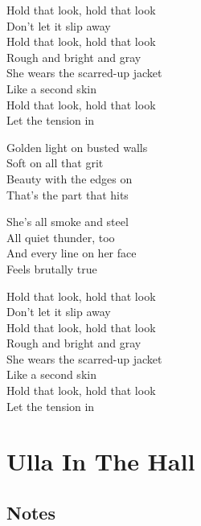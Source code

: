 \begin{lyrics}
Hold that look, hold that look\\
Don’t let it slip away\\
Hold that look, hold that look\\
Rough and bright and gray\\
She wears the scarred-up jacket\\
Like a second skin\\
Hold that look, hold that look\\
Let the tension in

Golden light on busted walls\\
Soft on all that grit\\
Beauty with the edges on\\
That’s the part that hits

She’s all smoke and steel\\
All quiet thunder, too\\
And every line on her face\\
Feels brutally true

Hold that look, hold that look\\
Don’t let it slip away\\
Hold that look, hold that look\\
Rough and bright and gray\\
She wears the scarred-up jacket\\
Like a second skin\\
Hold that look, hold that look\\
Let the tension in
\end{lyrics}

\section{Ulla In The Hall}
\subsection{Notes}
